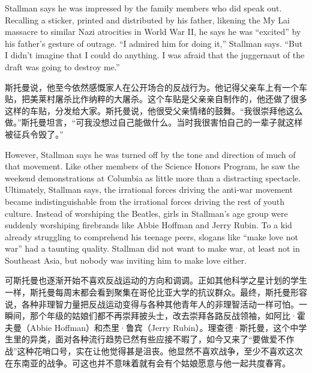 \ifdefined\eng
Stallman says he was impressed by the family members who did speak out. Recalling a sticker, printed and distributed by his father, likening the My Lai massacre to similar Nazi atrocities in World War II, he says he was ``excited'' by his father's gesture of outrage. ``I admired him for doing it,'' Stallman says. ``But I didn't imagine that I could do anything. I was afraid that the juggernaut of the draft was going to destroy me.''
\fi

\ifdefined\chs
斯托曼说，他至今依然感慨家人在公开场合的反战行为。他记得父亲车上有一个车贴，把美莱村屠杀比作纳粹的大屠杀。这个车贴是父亲亲自制作的，他还做了很多这样的车贴，分发给大家。斯托曼说，他很受父亲情绪的鼓舞。``我很崇拜他这么做。''斯托曼坦言，``可我没想过自己能做什么。当时我很害怕自己的一辈子就这样被征兵令毁了。''
\fi

\ifdefined\eng
However, Stallman says he was turned off by the tone and direction of much of that movement. Like other members of the Science Honors Program, he saw the weekend demonstrations at Columbia as little more than a distracting spectacle. Ultimately, Stallman says, the irrational forces driving the anti-war movement became indistinguishable from the irrational forces driving the rest of youth culture. Instead of worshiping the Beatles, girls in Stallman's age group were suddenly worshiping firebrands like Abbie Hoffman and Jerry Rubin. To a kid already struggling to comprehend his teenage peers, slogans like ``make love not war'' had a taunting quality. Stallman did not want to make war, at least not in Southeast Asia, but nobody was inviting him to make love either.
\fi

\ifdefined\chs
可斯托曼也逐渐开始不喜欢反战运动的方向和调调。正如其他科学之星计划的学生一样，斯托曼每周末都会看到聚集在哥伦比亚大学的抗议群众。最终，斯托曼形容说，各种非理智力量把反战运动变得与各种其他青年人的非理智活动一样可怕。一瞬间，那个年级的姑娘们都不再崇拜披头士，改去崇拜各路反战领袖，如阿比·霍夫曼（Abbie
Hoffman）和杰里·鲁宾（Jerry Rubin）。理查德·斯托曼，这个中学生里的异类，面对各种流行趋势已然有些应接不暇了，如今又来了``要做爱不作战''这种花哨口号，实在让他觉得甚是沮丧。他显然不喜欢战争，至少不喜欢这次在东南亚的战争。可这也并不意味着就有会有个姑娘愿意与他一起共度春宵。
\fi

